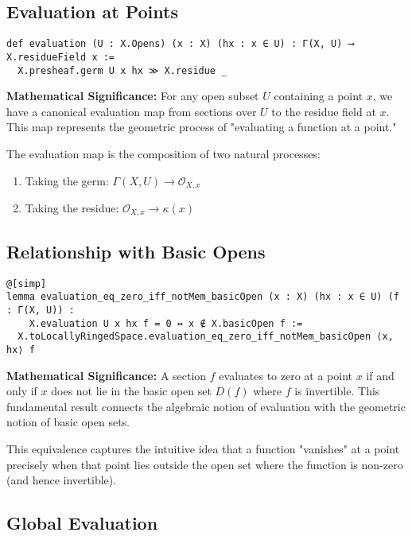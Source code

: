 \documentclass{article}
\theoremstyle{definition}
\begin{document}
\subsection{Evaluation at Points}

\begin{lstlisting}
def evaluation (U : X.Opens) (x : X) (hx : x ∈ U) : Γ(X, U) ⟶ X.residueField x :=
  X.presheaf.germ U x hx ≫ X.residue _
\end{lstlisting}

\textbf{Mathematical Significance:} For any open subset $U$ containing a point $x$, we have a canonical evaluation map from sections over $U$ to the residue field at $x$. This map represents the geometric process of "evaluating a function at a point."

The evaluation map is the composition of two natural processes:
\begin{enumerate}
\item Taking the germ: $\Gamma(X, U) \to \mathcal{O}_{X,x}$
\item Taking the residue: $\mathcal{O}_{X,x} \to \kappa(x)$
\end{enumerate}

\subsection{Relationship with Basic Opens}

\begin{lstlisting}
@[simp]
lemma evaluation_eq_zero_iff_notMem_basicOpen (x : X) (hx : x ∈ U) (f : Γ(X, U)) :
    X.evaluation U x hx f = 0 ↔ x ∉ X.basicOpen f :=
  X.toLocallyRingedSpace.evaluation_eq_zero_iff_notMem_basicOpen ⟨x, hx⟩ f
\end{lstlisting}

\textbf{Mathematical Significance:} A section $f$ evaluates to zero at a point $x$ if and only if $x$ does not lie in the basic open set $D(f)$ where $f$ is invertible. This fundamental result connects the algebraic notion of evaluation with the geometric notion of basic open sets.

This equivalence captures the intuitive idea that a function "vanishes" at a point precisely when that point lies outside the open set where the function is non-zero (and hence invertible).

\subsection{Global Evaluation}
\end{document}
